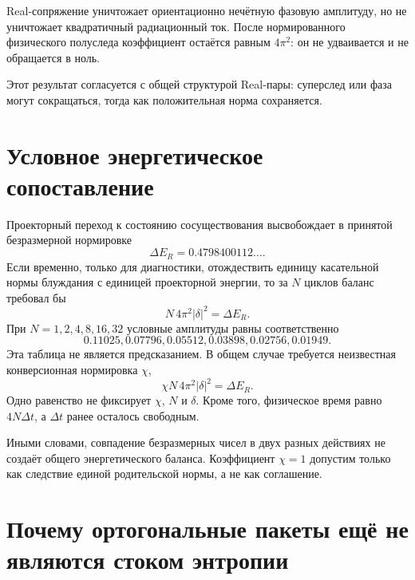 \begin{proposition}
Real-сопряжение уничтожает ориентационно нечётную фазовую амплитуду, но
не уничтожает квадратичный радиационный ток. После нормированного
физического полуследа коэффициент остаётся равным $4\pi^2$: он не
удваивается и не обращается в ноль.
\end{proposition}

Этот результат согласуется с общей структурой Real-пары: суперслед или
фаза могут сокращаться, тогда как положительная норма сохраняется.

\section{Условное энергетическое сопоставление}

Проекторный переход к состоянию сосуществования высвобождает в принятой
безразмерной нормировке
\begin{equation}
 \Delta E_R=0.4798400112\ldots.
\end{equation}
Если временно, только для диагностики, отождествить единицу касательной
нормы блуждания с единицей проекторной энергии, то за $N$ циклов баланс
требовал бы
\begin{equation}
 N\,4\pi^2|\delta|^2=\Delta E_R.
 \label{eq:v6-real-pair-conditional-energy-balance}
\end{equation}
При $N=1,2,4,8,16,32$ условные амплитуды равны соответственно
\begin{equation}
 0.11025, 0.07796, 0.05512, 0.03898, 0.02756, 0.01949.
\end{equation}
Эта таблица не является предсказанием. В общем случае требуется
неизвестная конверсионная нормировка $\chi$,
\begin{equation}
 \chi N\,4\pi^2|\delta|^2=\Delta E_R.
 \label{eq:v6-real-pair-free-conversion}
\end{equation}
Одно равенство не фиксирует $\chi$, $N$ и $\delta$. Кроме того, физическое
время равно $4N\Delta t$, а $\Delta t$ ранее осталось свободным.

Иными словами, совпадение безразмерных чисел в двух разных действиях не
создаёт общего энергетического баланса. Коэффициент $\chi=1$ допустим
только как следствие единой родительской нормы, а не как соглашение.

\section{Почему ортогональные пакеты ещё не являются стоком энтропии}

